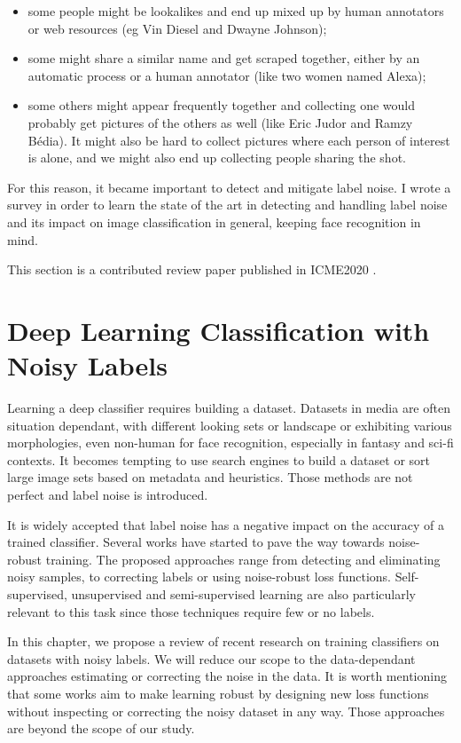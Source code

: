 \begin{itemize}
    \item some people might be lookalikes and end up mixed up by human annotators or web resources (eg Vin Diesel and Dwayne Johnson);
    \item some might share a similar name and get scraped together, either by an automatic process or a human annotator (like two women named Alexa);
    \item some others might appear frequently together and collecting one would probably get pictures of the others as well (like Eric Judor and Ramzy Bédia). It might also be hard to collect pictures where each person of interest is alone, and we might also end up collecting people sharing the shot.
\end{itemize}

For this reason, it became important to detect and mitigate label noise. I wrote a survey in order to learn the state of the art in detecting and handling label noise and its impact on image classification in general, keeping face recognition in mind.

This section is a contributed review paper published in ICME2020 \citep{MOIMOIMOIMOI}.

\section{Deep Learning Classification with Noisy Labels}
\label{sec:intro}

Learning a deep classifier requires building a dataset. Datasets in media are often situation dependant, with different looking sets or landscape or exhibiting various morphologies, even non-human for face recognition, especially in fantasy and sci-fi contexts. It becomes tempting to use search engines to build a dataset or sort large image sets based on metadata and heuristics. Those methods are not perfect and label noise is introduced.

It is widely accepted that label noise has a negative impact on the accuracy of a trained classifier. Several works have started to pave the way towards noise-robust training. The proposed approaches range from detecting and eliminating noisy samples, to correcting labels or using noise-robust loss functions. Self-supervised, unsupervised and semi-supervised learning are also particularly relevant to this task since those techniques require few or no labels.

In this chapter, we propose a review of recent research on training classifiers on datasets with noisy labels. We will reduce our scope to the data-dependant approaches estimating or correcting the noise in the data. It is worth mentioning that some works aim to make learning robust by designing new loss functions \citep{Bitempered,GeneralizedCE} without inspecting or correcting the noisy dataset in any way. Those approaches are beyond the scope of our study.

